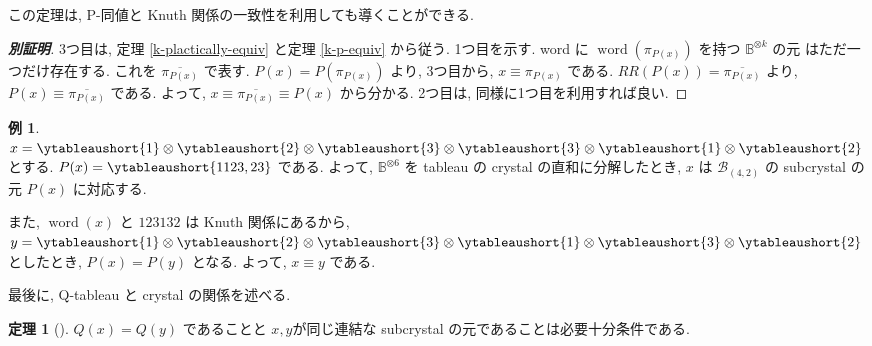\documentclass[
  a4paper, 
  12pt,
  ja=standard,
  xelatex,
  left=30truemm,
  right=30truemm,
  titlepage 
]{bxjsarticle}
\theoremstyle{definition}
\newtheorem{thm}{定理}[section]
\newtheorem*{ex}{例}
\begin{document}
この定理は,
P-同値と Knuth 関係の一致性を利用しても導くことができる.

\begin{proof}[\textbf{別証明}]
  3つ目は, 定理 \ref{k-plactically-equiv} と定理 \ref{k-p-equiv} から従う.
  1つ目を示す. word に $\operatorname{word}(\pi_{P(x)})$ を持つ $\mathbb{B}^{\otimes k}$ の元
  はただ一つだけ存在する. これを $\overline{\pi_{P(x)}}$ で表す.
  $P(x) = P(\pi_{P(x)})$ より, 3つ目から, $x \equiv \pi_{P(x)}$ である. 
  $RR(P(x)) = \overline{\pi_{P(x)}}$ より, $P(x) \equiv \overline{\pi_{P(x)}}$
  である.
  よって, $x \equiv \overline{\pi_{P(x)}} \equiv P(x)$ から分かる. 2つ目は, 同様に1つ目を利用すれば良い.
\end{proof}

\begin{ex}
  $x = \ytableaushort{1} \otimes \ytableaushort{2} \otimes \ytableaushort{3} \otimes \ytableaushort{3} \otimes \ytableaushort{1} \otimes \ytableaushort{2}$
  とする.
  $P(x) = \ytableaushort{1123,23}$ である.
  よって, $\mathbb{B}^{\otimes 6}$ を tableau の crystal の直和に分解したとき,
  $x$ は $\mathcal{B}_{(4, 2)}$ の subcrystal の元  $P(x)$ に対応する.

  また, $\operatorname{word}(x)$ と $123132$ は Knuth 関係にあるから,
  $y = \ytableaushort{1} \otimes \ytableaushort{2} \otimes \ytableaushort{3} \otimes \ytableaushort{1} \otimes \ytableaushort{3} \otimes \ytableaushort{2}$
  としたとき, $P(x) = P(y)$ となる. よって, $x \equiv y$ である.
\end{ex}

最後に, Q-tableau と crystal の関係を述べる.

\begin{thm} [{\cite[定理8.7]{b2}}] \label{crystal-and-q-tableau}
  $Q(x) = Q(y)$ であることと $x, y$が同じ連結な subcrystal の元であることは必要十分条件である.
\end{thm}
\end{document}
